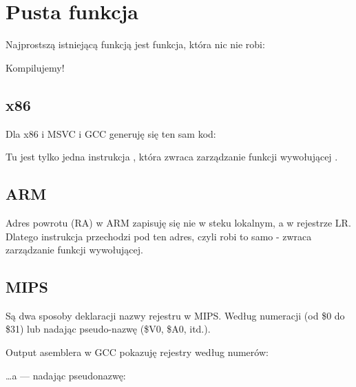 \section{Pusta funkcja}
\label{empty_func}

Najprostszą istniejącą funkcją jest funkcja, która nic nie robi:



Kompilujemy!

\subsection{x86}

Dla x86 i MSVC i GCC generuję się ten sam kod:



Tu jest tylko jedna instrukcja \RET, która zwraca zarządzanie funkcji wywołującej .

\subsection{ARM}



Adres powrotu (\ac{RA}) w ARM zapisuję się nie w steku lokalnym, a w rejestrze \ac{LR}.
Dlatego instrukcja  przechodzi pod ten adres, czyli robi to samo - zwraca zarządzanie funkcji wywołującej.

\subsection{MIPS}

Są dwa sposoby deklaracji nazwy rejestru w MIPS. Według numeracji (od \$0 do \$31) lub nadając pseudo-nazwę (\$V0, \$A0, itd.).

Output asemblera w GCC pokazuję rejestry według numerów:



\dots a \IDA --- nadając pseudonazwę:



